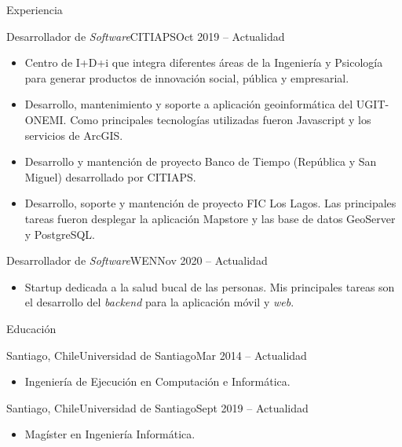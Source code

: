 \documentclass[]{mcdowellcv}
\begin{document}
	\makeheader
	
	\begin{cvsection}{Experiencia}
		\begin{cvsubsection}{Desarrollador de \textit{Software}}{CITIAPS}{Oct 2019 -- Actualidad}
			\begin{itemize}
				\item Centro de I+D+i que integra diferentes áreas de la Ingeniería y Psicología para generar productos de innovación social, pública y empresarial.
				\item Desarrollo, mantenimiento y soporte a aplicación geoinformática del UGIT-ONEMI. Como principales tecnologías utilizadas fueron Javascript y los servicios de ArcGIS.
				\item Desarrollo y mantención de proyecto Banco de Tiempo (República y San Miguel) desarrollado por CITIAPS.
				\item Desarrollo, soporte y mantención de proyecto FIC Los Lagos. Las principales tareas fueron desplegar la aplicación Mapstore y las base de datos GeoServer y PostgreSQL.  
			\end{itemize}
		\end{cvsubsection}
		
		\begin{cvsubsection}{Desarrollador de \textit{Software}}{WEN}{Nov 2020 -- Actualidad}		
			\begin{itemize}
				\item Startup dedicada a la salud bucal de las personas. Mis principales tareas son el desarrollo del \textit{backend} para la aplicación móvil y \textit{web}.
			\end{itemize}
		\end{cvsubsection}
	\end{cvsection}
	
	\begin{cvsection}{Educación}
		\begin{cvsubsection}{Santiago, Chile}{Universidad de Santiago}{Mar 2014 -- Actualidad}
			\begin{itemize}
				\item Ingeniería de Ejecución en Computación e Informática.
			\end{itemize}
		\end{cvsubsection}
		\begin{cvsubsection}{Santiago, Chile}{Universidad de Santiago}{Sept 2019 -- Actualidad}
			\begin{itemize}
				\item Magíster en Ingeniería Informática.
			\end{itemize}
		\end{cvsubsection}
	\end{cvsection}
	
\end{document}
